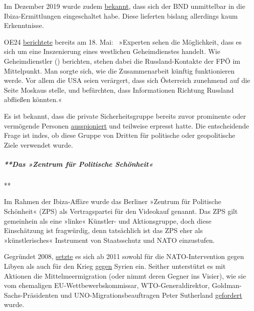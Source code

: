 Im Dezember 2019 wurde zudem
\href{https://www.youtube.com/watch?v=ApetEsHeXv0}{bekannt}, dass sich
der BND unmittelbar in die Ibiza-Ermittlungen eingeschaltet habe. Diese
lieferten bislang allerdings kaum Erkenntnisse.

OE24
\href{https://www.oe24.at/oesterreich/politik/Wer-steckt-hinter-dem-Strache-Video/380559980}{berichtete}
bereits am 18. Mai:~ »Experten sehen die Möglichkeit, dass es sich um
eine Inszenierung eines westlichen Geheimdienstes handelt. Wie
Geheimdienstler () berichten, stehen dabei die Russland-Kontakte der FPÖ
im Mittelpunkt. Man sorgte sich, wie die Zusammen­arbeit künftig
funktionieren werde. Vor allem die USA seien verärgert, dass sich
Österreich zunehmend auf die Seite Moskaus stelle, und befürchten, dass
Informationen Richtung Russland abfließen könnten.«

Es ist bekannt, dass die private Sicherheitsgruppe bereits zuvor
prominente oder vermögende Personen
\href{http://www.eu-infothek.com/ibiza-gate-schwerer-junge-j-h-liess-ueber-spezial-auskunftei-hunderte-wichtige-personen-vollkommen-ausspionieren/}{ausspioniert}
und teilweise erpresst hatte. Die entscheidende Frage ist indes, ob
diese Gruppe von Dritten für politische oder geopolitische Ziele
verwendet wurde.

\hypertarget{das-zentrum-fuxfcr-politische-schuxf6nheit}{%
\subparagraph{**Das »Zentrum für Politische
Schönheit«}\label{das-zentrum-fuxfcr-politische-schuxf6nheit}}

**

Im Rahmen der Ibiza-Affäre wurde das Berliner »Zentrum für Politische
Schönheit« (ZPS) als Vertragspartei für den Videokauf genannt. Das ZPS
gilt gemeinhein als eine »linke« Künstler- und Aktionsgruppe, doch diese
Einschätzung ist fragwürdig, denn tatsächlich ist das ZPS eher als
»künstlerisches« Instrument von Staatsschutz und NATO einzustufen.

Gegründet 2008,
\href{https://web.archive.org/web/20150621135759/http://www.gehvoran.com/2011/02/kriegsverbrechen-in-libyen-wo-bleibt-die-welt/}{setzte}
es sich ab 2011 sowohl für die NATO-Intervention gegen Libyen als auch
für den Krieg \href{http://www.barth-engelbart.de/?p=68977}{gegen}
Syrien ein. Seither unterstützt es mit Aktionen die
Mittel­meer­migration (oder nimmt deren Gegner ins Visier), wie sie vom
ehemaligen EU-Wett­bewerbs­kommissar, WTO-Generaldirektor,
Goldman-Sachs-Präsidenten und UNO-Migrations­beauftragen Peter
Sutherland
\href{https://de.wikipedia.org/wiki/Peter_Sutherland}{gefordert} wurde.

